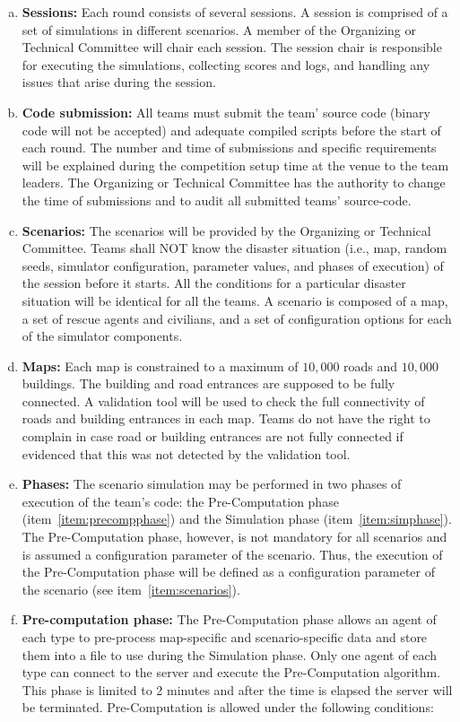 \documentclass{article}
\begin{document}
\begin{enumerate}[(a)]
\item \textbf{Sessions:} Each round consists of several sessions. A session is comprised of a set of simulations in different scenarios. A member of the Organizing or Technical Committee will chair each session. The session chair is responsible for executing the simulations, collecting scores and logs, and handling any issues that arise during the session.
\item \textbf{Code submission:} All teams must submit the team' source code (binary code will not be accepted) and adequate compiled scripts before the start of each round. The number and time of submissions and specific requirements will be explained during the competition setup time at the venue to the team leaders. The Organizing or Technical Committee has the authority to change the time of submissions and to audit all submitted teams' source-code.
\item \textbf{Scenarios:} The scenarios will be provided by the Organizing or Technical Committee. Teams shall NOT know the disaster situation (i.e., map, random seeds, simulator configuration, parameter values, and phases of execution) of the session before it starts. All the conditions for a particular disaster situation will be identical for all the teams. A scenario is composed of a map, a set of rescue agents and civilians, and a set of configuration options for each of the simulator components. \label{item:scenarios}
\item \textbf{Maps:} Each map is constrained to a maximum of $10,000$ roads and $10,000$ buildings. The building and road entrances are supposed to be fully connected. A validation tool will be used to check the full connectivity of roads and building entrances in each map. Teams do not have the right to complain in case road or building entrances are not fully connected if evidenced that this was not detected by the validation tool.
\item \textbf{Phases:} The scenario simulation may be performed in two phases of execution of the team's code: the Pre-Computation phase (item~\ref{item:precompphase}) and the Simulation phase (item~\ref{item:simphase}). The Pre-Computation phase, however, is not mandatory for all scenarios and is assumed a configuration parameter of the scenario. Thus, the execution of the Pre-Computation phase will be defined as a configuration parameter of the scenario (see item~\ref{item:scenarios}). \label{item:phases}
\item \textbf{Pre-computation phase:} The Pre-Computation phase allows an agent of each type to pre-process map-specific and scenario-specific data and store them into a file to use during the Simulation phase. Only one agent of each type can connect to the server and execute the Pre-Computation algorithm. This phase is limited to 2 minutes and after the time is elapsed the server will be terminated. Pre-Computation is allowed under the following conditions: \label{item:precompphase}

\end{enumerate}
\end{document}

